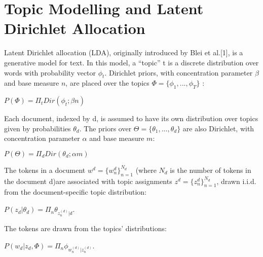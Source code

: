 \documentclass[10pt,a5paper,twoside]{article}
\begin{document}

\section{Topic Modelling and Latent Dirichlet Allocation}

Latent Dirichlet allocation (LDA), originally introduced by Blei et al.[1], is a generative model for text. In this model, a “topic” t is a discrete distribution over words with probability vector $\phi_{t}$. Dirichlet
priors, with concentration parameter $\beta$ and base measure $n$, are placed over the topics $\Phi = \lbrace \phi_{1}, ... , \phi_{T} \rbrace $ :

\begin{center}
$P\left( \Phi \right)  = \Pi_{t}  Dir\left(  \phi_{t} ; \beta n  \right) $
\end{center}


Each document, indexed by d, is assumed to have its own distribution over topics given by probabilities $\theta_{d}$. The priors over $\Theta = \lbrace  \theta_{1}, ... , \theta_{d}  \rbrace$ are also Dirichlet, with concentration parameter $\alpha$ and base measure $m$:

\begin{center}
$P\left( \Theta \right)  = \Pi_{d}  Dir\left(  \theta_{d} ; \alpha m  \right) $
\end{center}

The tokens in a document $w^{d} = \lbrace w^{d}_{n} \rbrace^{N_{d}}_{n=1} $ (where $N_d$ is the number of tokens in the document d)are associated with topic assignments $z^{d} = \lbrace z^{d}_{n} \rbrace^{N_{d}}_{n=1} $, drawn i.i.d. from the document-specific topic distribution:
\begin{center}
$P\left( z_{d} | \theta_{d}  \right) = \Pi_{n} \theta_{ z^{\left( d\right) }_{n} | d}$.
\end{center}
The tokens are drawn from the topics’ distributions:
\begin{center}
$P\left( w_{d} | z_{d}, \Phi  \right) = \Pi_{n} \phi_{ w^{\left( d\right) }_{n} | z^{\left( d\right) }_{n}}$.
\end{center}
\end{document}
